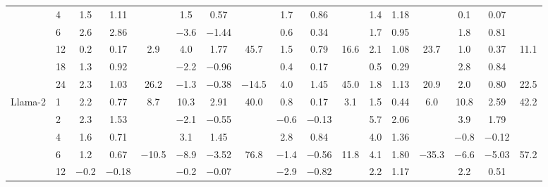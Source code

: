 \begin{table}[htbp]
{\begin{adjustbox}{max width=\linewidth, max totalheight=0.28\textheight}
\begin{tabular}{llccccccccccccccc}
 & 4 & \phantom{$-$}1.5 & \phantom{$-$}1.11 &  & \phantom{$-$0}1.5 & \phantom{$-$}0.57 &  & \phantom{$-$}1.7 & \phantom{$-$}0.86 &  & 1.4 & 1.18 &  & \phantom{$-$0}0.1 & \phantom{$-$}0.07 &  \\
 & 6 & \phantom{$-$}2.6 & \phantom{$-$}2.86 &  & \phantom{0}$-$3.6 & $-$1.44 &  & \phantom{$-$}0.6 & \phantom{$-$}0.34 &  & 1.7 & 0.95 &  & \phantom{$-$0}1.8 & \phantom{$-$}0.81 &  \\
 & 12 & \phantom{$-$}0.2 & \phantom{$-$}0.17 & \phantom{$-$0}2.9 & \phantom{$-$0}4.0 & \phantom{$-$}1.77 & \phantom{$-$}45.7 & \phantom{$-$}1.5 & \phantom{$-$}0.79 & 16.6 & 2.1 & 1.08 & \phantom{$-$}23.7 & \phantom{$-$0}1.0 & \phantom{$-$}0.37 & 11.1 \\
 & 18 & \phantom{$-$}1.3 & \phantom{$-$}0.92 &  & \phantom{0}$-$2.2 & $-$0.96 &  & \phantom{$-$}0.4 & \phantom{$-$}0.17 &  & 0.5 & 0.29 &  & \phantom{$-$0}2.8 & \phantom{$-$}0.84 &  \\
 & 24 & \phantom{$-$}2.3 & \phantom{$-$}1.03 & \phantom{$-$}26.2 & \phantom{0}$-$1.3 & $-$0.38 & $-$14.5 & \phantom{$-$}4.0 & \phantom{$-$}1.45 & 45.0 & 1.8 & 1.13 & \phantom{$-$}20.9 & \phantom{$-$0}2.0 & \phantom{$-$}0.80 & 22.5 \\
\midrule
Llama-2 & 1 & \phantom{$-$}2.2 & \phantom{$-$}0.77 & \phantom{$-$0}8.7 & \phantom{$-$}10.3 & \phantom{$-$}2.91 & \phantom{$-$}40.0 & \phantom{$-$}0.8 & \phantom{$-$}0.17 & \phantom{0}3.1 & 1.5 & 0.44 & \phantom{$-$0}6.0 & \phantom{$-$}10.8 & \phantom{$-$}2.59 & 42.2 \\
 & 2 & \phantom{$-$}2.3 & \phantom{$-$}1.53 &  & \phantom{0}$-$2.1 & $-$0.55 &  & $-$0.6 & $-$0.13 &  & 5.7 & 2.06 &  & \phantom{$-$0}3.9 & \phantom{$-$}1.79 &  \\
 & 4 & \phantom{$-$}1.6 & \phantom{$-$}0.71 &  & \phantom{$-$0}3.1 & \phantom{$-$}1.45 &  & \phantom{$-$}2.8 & \phantom{$-$}0.84 &  & 4.0 & 1.36 &  & \phantom{0}$-$0.8 & $-$0.12 &  \\
 & 6 & \phantom{$-$}1.2 & \phantom{$-$}0.67 & $-$10.5 & \phantom{0}$-$8.9 & $-$3.52 & \phantom{$-$}76.8 & $-$1.4 & $-$0.56 & 11.8 & 4.1 & 1.80 & $-$35.3 & \phantom{0}$-$6.6 & $-$5.03 & 57.2 \\
 & 12 & $-$0.2 & $-$0.18 &  & \phantom{0}$-$0.2 & $-$0.07 &  & $-$2.9 & $-$0.82 &  & 2.2 & 1.17 &  & \phantom{$-$0}2.2 & \phantom{$-$}0.51 &  \\
\bottomrule
\end{tabular}
\end{adjustbox}
}
\end{table}
